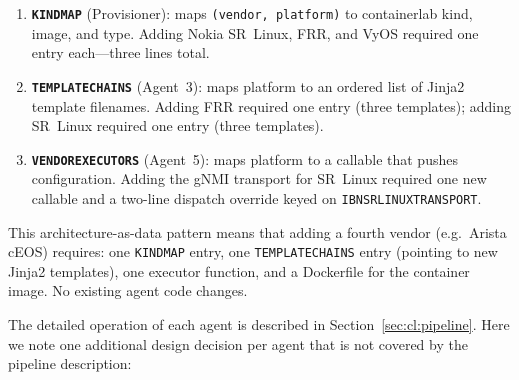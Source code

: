 \documentclass[acmtog]{acmart}
\renewcommand\_{\textunderscore\allowbreak}
\begin{document}
\begin{enumerate}
  \item \textbf{\texttt{\_KIND\_MAP}} (Provisioner): maps
    \texttt{(vendor, platform)} to containerlab kind, image, and
    type. Adding Nokia SR~Linux, FRR, and VyOS required one entry
    each---three lines total.
  \item \textbf{\texttt{\_TEMPLATE\_CHAINS}} (Agent~3): maps
    platform to an ordered list of Jinja2 template filenames. Adding
    FRR required one entry (three templates); adding SR~Linux
    required one entry (three templates).
  \item \textbf{\texttt{\_VENDOR\_EXECUTORS}} (Agent~5): maps
    platform to a callable that pushes configuration. Adding the
    gNMI transport for SR~Linux required one new callable and a
    two-line dispatch override keyed on
    \texttt{IBN\_SRLINUX\_TRANSPORT}.
\end{enumerate}

This architecture-as-data pattern means that adding a fourth vendor
(e.g.\ Arista cEOS) requires: one \texttt{\_KIND\_MAP} entry, one
\texttt{\_TEMPLATE\_CHAINS} entry (pointing to new Jinja2
templates), one executor function, and a Dockerfile for the container
image. No existing agent code changes.

The detailed operation of each agent is described in
Section~\ref{sec:cl:pipeline}. Here we note one additional design
decision per agent that is not covered by the pipeline description:
\end{document}

